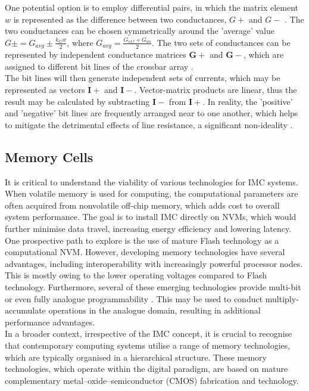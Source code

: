 \noindent One potential option is to employ differential pairs, in which the matrix element $w$ is represented as the difference between two conductances, $G+$ and $G-$ \cite{joksas2022nonideality}. The two conductances can be chosen symmetrically around the 'average' value $G \pm = G_{avg} \pm \frac{k_G w}{2}$, where $G_{avg} = \frac{G_{off} + G_{on}}{2}$. The two sets of conductances can be represented by independent conductance matrices $\mathbf{G}+$ and $\mathbf{G}-$, which are assigned to different bit lines of the crossbar array \cite{kim20214k}. \\

\noindent The bit lines will then generate independent sets of currents, which may be represented as vectors $\mathbf{I}+$ and $\mathbf{I}-$. Vector-matrix products are linear, thus the result may be calculated by subtracting $\mathbf{I}-$ from $\mathbf{I}+$. In reality, the 'positive' and 'negative' bit lines are frequently arranged near to one another, which helps to mitigate the detrimental effects of line resistance, a significant non-ideality \cite{joksas2020committee}. 


\subsection[Memory Cells]{Memory Cells}

It is critical to understand the viability of various technologies for IMC systems. When volatile memory is used for computing, the computational parameters are often acquired from nonvolatile off-chip memory, which adds cost to overall system performance. The goal is to install IMC directly on NVMs, which would further minimise data travel, increasing energy efficiency and lowering latency. \\

\noindent One prospective path to explore is the use of mature Flash technology as a computational NVM. However, developing memory technologies have several advantages, including interoperability with increasingly powerful processor nodes. This is mostly owing to the lower operating voltages compared to Flash technology. Furthermore, several of these emerging technologies provide multi-bit or even fully analogue programmability \cite{mannocci2023memory}. This may be used to conduct multiply-accumulate operations in the analogue domain, resulting in additional performance advantages. \\

\noindent In a broader context, irrespective of the IMC concept, it is crucial to recognise that contemporary computing systems utilise a range of memory technologies, which are typically organised in a hierarchical structure. These memory technologies, which operate within the digital paradigm, are based on mature complementary metal–oxide–semiconductor (CMOS) fabrication and technology. \\



